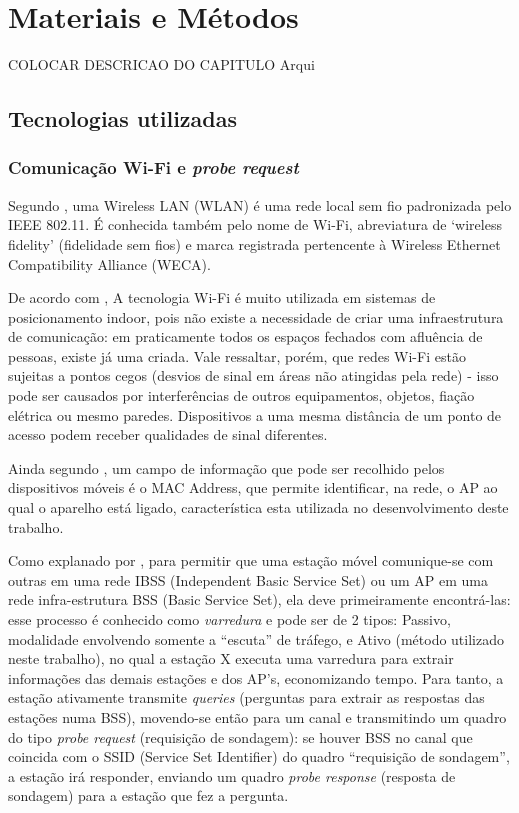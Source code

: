 
\chapter{Materiais e Métodos}
\label{metodologia}
COLOCAR DESCRICAO DO CAPITULO Arqui

\section{Tecnologias utilizadas}
\label{tecnologias-usadas}

\subsection{Comunicação Wi-Fi e \emph{probe request}}
Segundo \cite{Teleco2008}, uma Wireless LAN (WLAN) é uma rede local sem fio padronizada pelo IEEE 802.11. É conhecida também pelo nome de Wi-Fi, abreviatura de ‘wireless fidelity’ (fidelidade sem fios) e marca registrada pertencente à Wireless Ethernet Compatibility Alliance (WECA). 

De acordo com \cite{SIMOES2015}, A tecnologia Wi-Fi é muito utilizada em sistemas de posicionamento indoor, pois não existe a necessidade de criar uma infraestrutura de comunicação: em praticamente todos os espaços fechados com afluência de pessoas, existe já uma criada. Vale ressaltar, porém, que redes Wi-Fi estão sujeitas a pontos cegos (desvios de sinal em áreas não atingidas pela rede) - isso pode ser causados por interferências de outros equipamentos, objetos, fiação elétrica ou mesmo paredes. Dispositivos a uma mesma distância de um ponto de acesso podem receber qualidades de sinal diferentes. 

Ainda segundo \cite{SIMOES2015}, um campo de informação que pode ser recolhido pelos dispositivos móveis é o MAC Address, que permite identificar, na rede, o AP ao qual o aparelho está ligado, característica esta utilizada no desenvolvimento deste trabalho. 

Como explanado por \cite{Teleco2016}, para permitir que uma estação móvel comunique-se com outras em uma rede IBSS (Independent Basic Service Set) ou um AP em uma rede infra-estrutura BSS (Basic Service Set), ela deve primeiramente encontrá-las: esse processo é conhecido como \emph{varredura} e pode ser de 2 tipos: Passivo, modalidade envolvendo somente a “escuta” de tráfego, e Ativo (método utilizado neste trabalho), no qual a estação X executa uma varredura para extrair informações das demais estações e dos AP’s, economizando tempo. Para tanto, a estação ativamente transmite \emph{queries} (perguntas para extrair as respostas das estações numa BSS), movendo-se então para um canal e transmitindo um quadro do tipo \emph{probe request} (requisição de sondagem): se houver BSS no canal que coincida com o SSID (Service Set Identifier) do quadro “requisição de sondagem”, a estação irá responder, enviando um quadro \emph{probe response} (resposta de sondagem) para a estação que fez a pergunta.

